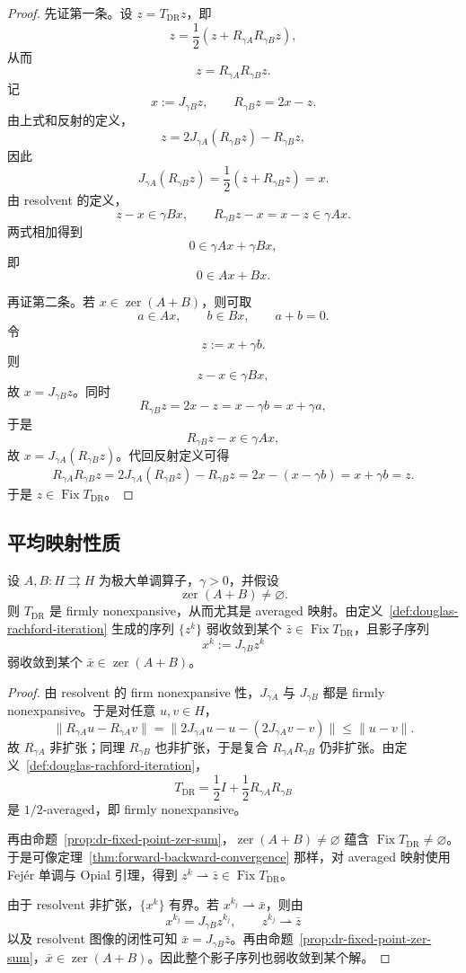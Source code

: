 \begin{proof}
先证第一条。设 $z=T_{\mathrm{DR}}z$，即
\[
z=\frac12(z+R_{\gamma A}R_{\gamma B}z),
\]
从而
\[
z=R_{\gamma A}R_{\gamma B}z.
\]
记
\[
x:=J_{\gamma B}z,
\qquad
R_{\gamma B}z=2x-z.
\]
由上式和反射的定义，
\[
z
=
2J_{\gamma A}(R_{\gamma B}z)-R_{\gamma B}z,
\]
因此
\[
J_{\gamma A}(R_{\gamma B}z)
=
\frac12(z+R_{\gamma B}z)
=
x.
\]
由 resolvent 的定义，
\[
z-x\in \gamma Bx,
\qquad
R_{\gamma B}z-x=x-z\in \gamma A x.
\]
两式相加得到
\[
0\in \gamma A x+\gamma Bx,
\]
即
\[
0\in Ax+Bx.
\]

再证第二条。若 $x\in \operatorname{zer}(A+B)$，则可取
\[
a\in Ax,\qquad b\in Bx,\qquad a+b=0.
\]
令
\[
z:=x+\gamma b.
\]
则
\[
z-x\in \gamma Bx,
\]
故 $x=J_{\gamma B}z$。同时
\[
R_{\gamma B}z=2x-z=x-\gamma b=x+\gamma a,
\]
于是
\[
R_{\gamma B}z-x\in \gamma A x,
\]
故 $x=J_{\gamma A}(R_{\gamma B}z)$。代回反射定义可得
\[
R_{\gamma A}R_{\gamma B}z
=
2J_{\gamma A}(R_{\gamma B}z)-R_{\gamma B}z
=
2x-(x-\gamma b)
=
x+\gamma b
=
z.
\]
于是 $z\in \operatorname{Fix}T_{\mathrm{DR}}$。
\end{proof}

\subsection{平均映射性质}

\begin{theorem}\label{thm:douglas-rachford-averaged}
设 $A,B\colon H\rightrightarrows H$ 为极大单调算子，$\gamma>0$，并假设
\[
\operatorname{zer}(A+B)\neq \varnothing.
\]
则 $T_{\mathrm{DR}}$ 是 firmly nonexpansive，从而尤其是 averaged 映射。由定义~\ref{def:douglas-rachford-iteration} 生成的序列 $\{z^k\}$ 弱收敛到某个 $\bar z\in \operatorname{Fix}T_{\mathrm{DR}}$，且影子序列
\[
x^k:=J_{\gamma B}z^k
\]
弱收敛到某个 $\bar x\in \operatorname{zer}(A+B)$。
\end{theorem}

\begin{proof}
由 resolvent 的 firm nonexpansive 性，$J_{\gamma A}$ 与 $J_{\gamma B}$ 都是 firmly nonexpansive。于是对任意 $u,v\in H$，
\[
\|R_{\gamma A}u-R_{\gamma A}v\|
=
\|2J_{\gamma A}u-u-(2J_{\gamma A}v-v)\|
\le \|u-v\|.
\]
故 $R_{\gamma A}$ 非扩张；同理 $R_{\gamma B}$ 也非扩张，于是复合 $R_{\gamma A}R_{\gamma B}$ 仍非扩张。由定义~\ref{def:douglas-rachford-iteration}，
\[
T_{\mathrm{DR}}=\frac12 I+\frac12 R_{\gamma A}R_{\gamma B}
\]
是 $1/2$-averaged，即 firmly nonexpansive。

再由命题~\ref{prop:dr-fixed-point-zer-sum}，$\operatorname{zer}(A+B)\neq\varnothing$ 蕴含 $\operatorname{Fix}T_{\mathrm{DR}}\neq\varnothing$。于是可像定理~\ref{thm:forward-backward-convergence} 那样，对 averaged 映射使用 Fej\'er 单调与 Opial 引理，得到 $z^k\rightharpoonup \bar z\in \operatorname{Fix}T_{\mathrm{DR}}$。

由于 resolvent 非扩张，$\{x^k\}$ 有界。若 $x^{k_j}\rightharpoonup \bar x$，则由
\[
x^{k_j}=J_{\gamma B}z^{k_j},
\qquad
z^{k_j}\rightharpoonup \bar z
\]
以及 resolvent 图像的闭性可知 $\bar x=J_{\gamma B}\bar z$。再由命题~\ref{prop:dr-fixed-point-zer-sum}，$\bar x\in \operatorname{zer}(A+B)$。因此整个影子序列也弱收敛到某个解。
\end{proof}

